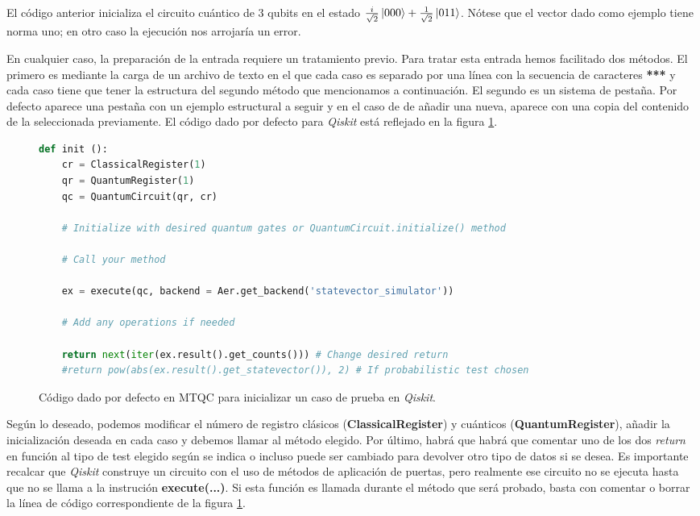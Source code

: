 El código anterior inicializa el circuito cuántico de 3 qubits en el estado $\frac{i}{\sqrt{2}}\left|000\right\rangle+\frac{1}{\sqrt{2}}\left|011\right\rangle$. Nótese que el vector dado como ejemplo tiene norma uno; en otro caso la ejecución nos arrojaría un error.

En cualquier caso, la preparación de la entrada requiere un tratamiento previo. Para tratar esta entrada hemos facilitado dos métodos. El primero es mediante la carga de un archivo de texto en el que cada caso es separado por una línea con la secuencia de caracteres \textbf{***} y cada caso tiene que tener la estructura del segundo método que mencionamos a continuación. El segundo es un sistema de pestaña. Por defecto aparece una pestaña con un ejemplo estructural a seguir y en el caso de de añadir una nueva, aparece con una copia del contenido de la seleccionada previamente. El código dado por defecto para \textit{Qiskit} está reflejado en la figura \ref{fig:code3}.

\begin{figure}[htb]
\begin{lstlisting}[language=Python]
def init ():
	cr = ClassicalRegister(1)
	qr = QuantumRegister(1)
	qc = QuantumCircuit(qr, cr)

	# Initialize with desired quantum gates or QuantumCircuit.initialize() method

	# Call your method

	ex = execute(qc, backend = Aer.get_backend('statevector_simulator'))

	# Add any operations if needed
	
	return next(iter(ex.result().get_counts())) # Change desired return
	#return pow(abs(ex.result().get_statevector()), 2) # If probabilistic test chosen
\end{lstlisting}
\caption{Código dado por defecto en MTQC para inicializar un caso de prueba en \textit{Qiskit}.}
\label{fig:code3}
\end{figure}

Según lo deseado, podemos modificar el número de registro clásicos (\textbf{ClassicalRegister}) y cuánticos (\textbf{QuantumRegister}), añadir la inicialización deseada en cada caso y debemos llamar al método elegido. Por último, habrá que habrá que comentar uno de los dos \textit{return} en función al tipo de test elegido según se indica o incluso puede ser cambiado para devolver otro tipo de datos si se desea. Es importante recalcar que \textit{Qiskit} construye un circuito con el uso de métodos de aplicación de puertas, pero realmente ese circuito no se ejecuta hasta que no se llama a la instrución \textbf{execute(...)}. Si esta función es llamada durante el método que será probado, basta con comentar o borrar la línea de código correspondiente de la figura \ref{fig:code3}.

